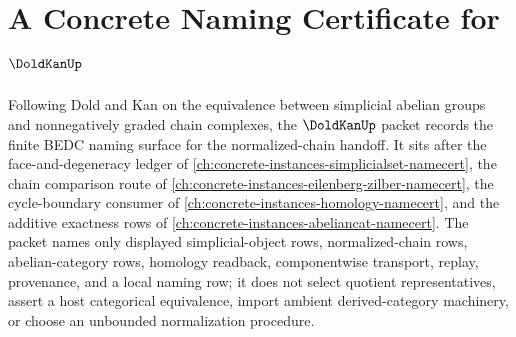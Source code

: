 \chapter{A Concrete Naming Certificate for $\DoldKanUp$}
\label{ch:concrete-instances-dold-kan-namecert}

Following Dold and Kan on the equivalence between simplicial abelian groups and nonnegatively graded chain complexes, the $\DoldKanUp$ packet records the finite BEDC naming surface for the normalized-chain handoff. It sits after the face-and-degeneracy ledger of \autoref{ch:concrete-instances-simplicialset-namecert}, the chain comparison route of \autoref{ch:concrete-instances-eilenberg-zilber-namecert}, the cycle-boundary consumer of \autoref{ch:concrete-instances-homology-namecert}, and the additive exactness rows of \autoref{ch:concrete-instances-abeliancat-namecert}. The packet names only displayed simplicial-object rows, normalized-chain rows, abelian-category rows, homology readback, componentwise transport, replay, provenance, and a local naming row; it does not select quotient representatives, assert a host categorical equivalence, import ambient derived-category machinery, or choose an unbounded normalization procedure.

